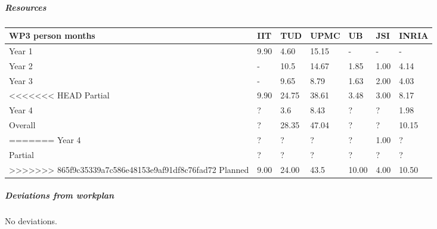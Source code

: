 
\subparagraph{Resources}

\begin{center}
\begin{tabular}{|C{1.5cm}|C{1.5cm}|C{1.5cm}|C{2cm}|C{2cm}|C{2cm}|C{2cm}|}
\hline
\footnotesize \textbf{WP3 person months} & \footnotesize \textbf{IIT}&\footnotesize \textbf{TUD}&\footnotesize \textbf{UPMC}& \footnotesize \textbf{UB} &\footnotesize \textbf{JSI} &\footnotesize \textbf{INRIA} \\ \hline
\footnotesize Year 1  &  9.90 & 4.60  & 15.15 & -    & -    &  -   \\  \hline
\footnotesize Year 2  &  -    & 10.5  & 14.67 & 1.85 & 1.00 & 4.14  \\  \hline
\footnotesize Year 3  &  -    & 9.65  & 8.79  & 1.63 & 2.00 & 4.03 \\  \hline
<<<<<<< HEAD
\footnotesize Partial &  9.90 & 24.75 & 38.61 & 3.48 & 3.00 & 8.17 \\  \hline
\footnotesize Year 4  & ?     & 3.6   & 8.43    & ?    & ?    & 1.98    \\   	\hline
\footnotesize Overall & ?     & 28.35    & 47.04    & ?    & ?    & 10.15    \\
=======
\footnotesize Year 4  & ?     & ?     & ?     & ?    & 1.00 & ?    \\   	\hline
\footnotesize Partial & ?     & ?    & ?    & ?    & ?    & ?    \\
>>>>>>> 865f9c35339a7c586e48153e9af91df8c76fad72
\hline \hline
\footnotesize Planned &  9.00 & 24.00 & 43.5 & 10.00 & 4.00 & 10.50 \\ \hline
\end{tabular}
\end{center}


\subparagraph*{Deviations from workplan}

No deviations.


